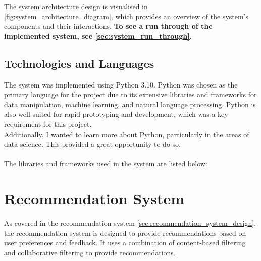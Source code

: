 The system architecture design is visualised in \cref{fig:system_architecture_diagram}, which provides an overview of the system's components and their interactions.
\textbf{To see a run through of the implemented system, see \cref{sec:system_run_through}.}

\subsection{Technologies and Languages}
\label{sec:technologies_and_languages}

The system was implemented using Python 3.10. Python was chosen as the primary language for the project due to its extensive libraries and frameworks for data manipulation, machine learning, and natural language processing.
Python is also well suited for rapid prototyping and development, which was a key requirement for this project.
\\
Additionally, I wanted to learn more about Python, particularly in the areas of data science. This provided a great opportunity to do so.
\\\\
The libraries and frameworks used in the system are listed below:


\section{Recommendation System}
\label{subsec:recommendation_system}
As covered in the recommendation system \cref{sec:recommendation_system_design}, the recommendation system is designed to provide recommendations based on user preferences and feedback.
It uses a combination of content-based filtering and collaborative filtering to provide recommendations.


